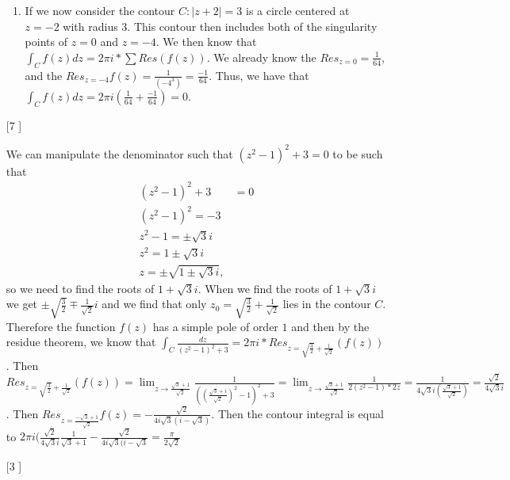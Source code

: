 \documentclass{article}
\theoremstyle{definition}
\begin{document}
\begin{enumerate}
\begin{enumerate}
        \item
        
        If we now consider the contour $C: |z + 2| = 3$ is a circle centered at $z = -2$ with radius 3. This contour then includes both of the singularity points of $z = 0$ and $z = -4$. We then know that $\int_Cf(z)dz = 2\pi i * \sum Res(f(z))$. We already know the $Res_{z = 0} = \frac{1}{64}$, and the $Res_{z = -4}f(z) = \frac{1}{(-4^3)} = \frac{-1}{64}$. Thus, we have that $\int_{C}f(z)dz = 2\pi i (\frac{1}{64} + \frac{-1}{64}) = 0.$
        
    \end{enumerate}
    
    \item [[\phantom{-}7]]
    
    We can manipulate the denominator such that $(z^2 - 1)^2 + 3 = 0$ to be such that
    \begin{align*}
        (z^2 - 1)^2 + 3 &= 0\\
        (z^2 - 1)^2 = -3\\
        z^2 - 1 = \pm\sqrt{3}i\\
        z^2 = 1 \pm \sqrt{3}i\\
        z = \pm\sqrt{1\pm\sqrt{3}i},
    \end{align*} so we need to find the roots of $1 + \sqrt{3}i$. When we find the roots of $1 + \sqrt{3}i$ we get $\pm \sqrt{\frac{3}{2}} \mp \frac{1}{\sqrt{2}}i$ and we find that only $z_0 = \sqrt{\frac{3}{2}} + \frac{1}{\sqrt{2}}$ lies in the contour $C$. Therefore the function $f(z)$ has a simple pole of order $1$ and then by the residue theorem, we know that $\int_C\frac{dz}{(z^2 -1)^2 + 3} = 2\pi i*Res_{z = \sqrt{\frac{3}{2}} + \frac{1}{\sqrt{2}}}(f(z))$. Then $Res_{z = \sqrt{\frac{3}{2}} + \frac{1}{\sqrt{2}}}(f(z)) = \lim_{z \to \frac{\sqrt{3} + 1}{\sqrt{2}}}\frac{1}{((\frac{\sqrt{3} + i}{\sqrt{2}})^2 - 1)^2 + 3} = \lim_{z \to \frac{\sqrt{3} + 1}{\sqrt{2}}} \frac{1}{2(z^2 - 1)*2z} = \frac{1}{4\sqrt{3}i(\frac{\sqrt{3} + 1}{\sqrt{2}})} = \frac{\sqrt{2}}{4\sqrt{3}i}$. Then $Res_{z = \frac{-\sqrt{3} + 1}{\sqrt{2}}}f(z) = -\frac{\sqrt{2}}{4i\sqrt{3}(i-\sqrt{3})}$. Then the contour integral is equal to $2\pi i (\frac{\sqrt{2}}{4\sqrt{3}i}\frac{1}{\sqrt{3} + 1} - \frac{\sqrt{2}}{4i\sqrt{3}(i-\sqrt{3}} = \frac{\pi}{2\sqrt{2}}$
    
    \item [[\phantom{-}3]]
    

\end{enumerate}
\end{document}
